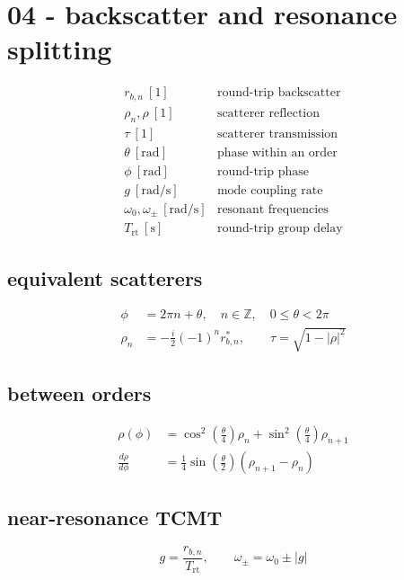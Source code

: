 \section*{04 - backscatter and resonance splitting}

\[
\begin{array}{ll}r_{b,n}\ [1]&\text{round-trip backscatter}\\[0.6em]\rho_n,\rho\ [1]&\text{scatterer reflection}\\[0.6em]\tau\ [1]&\text{scatterer transmission}\\[0.6em]\theta\ [\mathrm{rad}]&\text{phase within an order}\\[0.6em]\phi\ [\mathrm{rad}]&\text{round-trip phase}\\[0.6em]g\ [\mathrm{rad/s}]&\text{mode coupling rate}\\[0.6em]\omega_0,\omega_\pm\ [\mathrm{rad/s}]&\text{resonant frequencies}\\[0.6em]T_{\mathrm{rt}}\ [\mathrm s]&\text{round-trip group delay}\end{array}
\]

\subsection*{equivalent scatterers}
\[
\displaystyle \begin{aligned}\phi&=2\pi n+\theta,\quad n\in\mathbb Z,\quad0\le\theta<2\pi\\\rho_n&=-\frac{i}{2}(-1)^n r_{b,n}^*,\qquad\tau=\sqrt{1-|\rho|^2}\end{aligned}
\]

\subsection*{between orders}
\[
\displaystyle \begin{aligned}\rho(\phi)&=\cos^2\!\left(\frac\theta4\right)\rho_n+\sin^2\!\left(\frac\theta4\right)\rho_{n+1}\\\frac{d\rho}{d\phi}&=\frac14\sin\!\left(\frac\theta2\right)(\rho_{n+1}-\rho_n)\end{aligned}
\]

\subsection*{near-resonance TCMT}
\[
\displaystyle g=\frac{r_{b,n}}{T_{\mathrm{rt}}},\qquad\omega_\pm=\omega_0\pm|g|
\]
